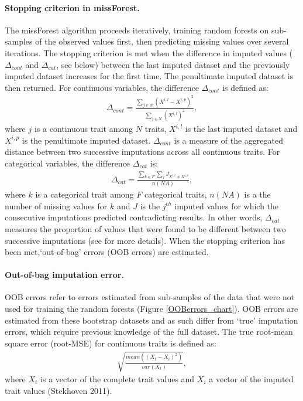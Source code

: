 \paragraph{Stopping criterion in missForest.}
The missForest algorithm proceeds iteratively, training random forests on sub-samples of the observed values first, then predicting missing values over several iterations. The stopping criterion is met when the difference in imputed values ($\Delta_{cont}$ and $\Delta_{cat}$, see below) between the last imputed dataset and the previously imputed dataset increases for the first time. The penultimate imputed dataset is then returned. For continuous variables, the difference $\Delta_{cont}$  is defined as:
\begin{align}
\Delta_{cont}=\frac{\sum_{j \in N}\left(X^{i,l}-X^{i,p}\right)^2}{\sum_{j \in N}\left(X^{i,l}\right)^2}, 
\end{align}
where $j$ is a continuous trait among $N$ traits, $X^{i,l}$ is the last imputed dataset and $X^{i,p}$ is the penultimate imputed dataset.  $\Delta_{cont}$ is a measure of the aggregated distance between two successive imputations across all continuous traits. For categorical variables, the difference $\Delta_{cat}$ is:
\begin{align}
\Delta_{cat}=\frac{\sum_{k \in F}\sum_{j} J_{X^{i,l}\neq X^{i,p}}}{n(NA)}, 
\label{eqPFC}
\end{align}
where $k$ is a categorical trait among $F$ categorical traits, $n(NA)$ is a the number of missing values for $k$ and $J$ is the $j^{th}$ imputed values for which the consecutive imputations predicted contradicting results. In other words, $\Delta_{cat}$ measures the proportion of values that were found to be different between two successive imputations (see \cite{Stekhoven2012} for more details). When the stopping criterion has been met,`out-of-bag' errors (OOB errors) are estimated.

\paragraph{Out-of-bag imputation error.}
OOB errors refer to errors estimated from sub-samples of the data that were not used for training the random forests (Figure \ref{OOBerrors_chart}). OOB errors are estimated from these bootstrap datasets and as such differ from `true' imputation errors, which require previous knowledge of the full dataset. The true root-mean square error (root-MSE) for continuous traits is defined as: 
\begin{align}
\sqrt{\frac{mean\left(\left(X_t-X_i\right)^2\right)}{var\left(X_t\right)}}, 
\label{true_MSE}
\end{align}
where $X_t$ is a vector of the complete trait values and $X_i$ a vector of the imputed trait values (Stekhoven 2011).

